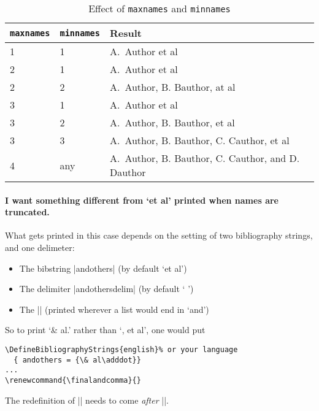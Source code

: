 \begin{table}
\begin{tabularx}{\textwidth}{llX}
\toprule
\texttt{maxnames} & \texttt{minnames} & Result \\
\midrule
1                 &  1                & A.\ Author et al \\
2                 &  1                & A.\ Author et al \\
2                 &  2                & A.\ Author, B. Bauthor, at al \\
3                 &  1                & A.\ Author et al \\
3                 &  2                & A.\ Author, B. Bauthor, et al \\
3                 &  3                & A.\ Author, B. Bauthor, C. Cauthor, et al \\
4                 &  any              & A.\ Author, B. Bauthor, C. Cauthor, and D. Dauthor \\
\bottomrule
\end{tabularx}
\caption{Effect of \texttt{maxnames} and \texttt{minnames}\label{maxnames}}
\end{table}

\paragraph{I want something different from `et al' printed when names are truncated.} What gets printed in this case depends on the setting of two bibliography strings, and one delimeter:
\begin{itemize}
\item The bibstring |andothers| (by default `et al')
\item The delimiter |andothersdelim| (by default ` ')
\item The |\finalandcomma| (printed wherever a list would end in `and')
\end{itemize}
So to print `\& al.' rather than `, et al', one would put
\begin{Verbatim}
\DefineBibliographyStrings{english}% or your language
  { andothers = {\& al\adddot}}
...
\renewcommand{\finalandcomma}{}
\end{Verbatim}
The redefinition of |\finalandcomma| needs to come \emph{after} ||.

